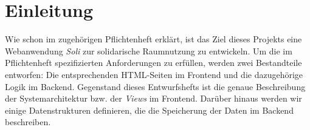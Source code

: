 
\chapter{Einleitung}
\label{ch:preface}


Wie schon im zugehörigen Pflichtenheft erklärt, ist das Ziel dieses Projekts eine Webanwendung \textit{Soli} zur solidarische Raumnutzung zu entwickeln.
Um die im Pflichtenheft spezifizierten Anforderungen zu erfüllen, werden zwei Bestandteile entworfen: Die entsprechenden HTML-Seiten im Frontend und die dazugehörige Logik im Backend.
Gegenstand dieses Entwurfshefts ist die genaue Beschreibung der Systemarchitektur bzw. der \textit{Views} im Frontend.
Darüber hinaus werden wir einige Datenstrukturen definieren, die die Speicherung der Daten im Backend beschreiben.